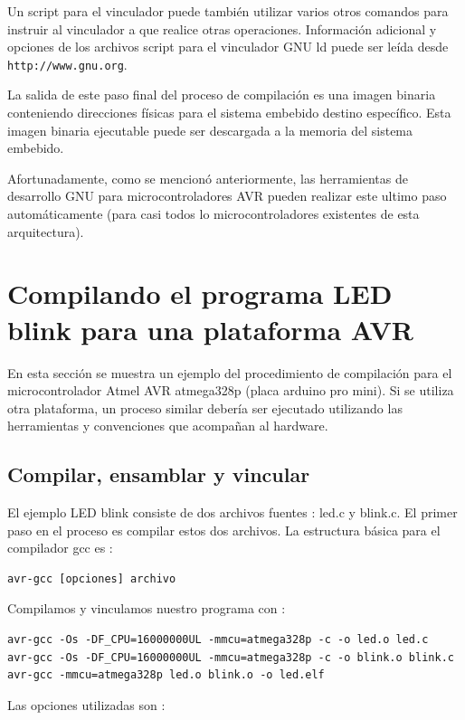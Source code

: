 \documentclass[output=paper, 
colorlinks,
citecolor=brown,
newtxmath
]{langscibook}
\begin{document}
Un script para el vinculador puede también utilizar varios otros comandos
para instruir al vinculador a que realice otras operaciones.
Información adicional y opciones de los archivos script para el vinculador GNU ld
puede ser leída desde \texttt{http://www.gnu.org}.

La salida de este paso final del proceso de compilación es una imagen binaria
conteniendo direcciones físicas para el sistema embebido destino específico.
Esta imagen binaria ejecutable puede ser descargada a la memoria del sistema embebido.

Afortunadamente, como se mencionó anteriormente, las herramientas de desarrollo
GNU para microcontroladores AVR pueden realizar este ultimo paso automáticamente
(para casi todos lo microcontroladores existentes de esta arquitectura).

\section {Compilando el programa LED blink para una plataforma AVR}

En esta sección se muestra un ejemplo del procedimiento de compilación 
para el microcontrolador Atmel AVR atmega328p (placa arduino pro mini).
Si se utiliza otra plataforma, un proceso similar debería ser ejecutado
utilizando las herramientas y convenciones que acompañan al hardware.

\subsection {Compilar, ensamblar y vincular}

El ejemplo LED blink consiste de dos archivos fuentes : led.c y blink.c.
El primer paso en el proceso es compilar estos dos archivos.
La estructura básica para el compilador gcc es :

\begin{verbatim}
avr-gcc [opciones] archivo
\end{verbatim}

Compilamos y vinculamos nuestro programa con :

\begin{verbatim}
avr-gcc -Os -DF_CPU=16000000UL -mmcu=atmega328p -c -o led.o led.c
avr-gcc -Os -DF_CPU=16000000UL -mmcu=atmega328p -c -o blink.o blink.c
avr-gcc -mmcu=atmega328p led.o blink.o -o led.elf
\end{verbatim}

Las opciones utilizadas son :
\end{document}
